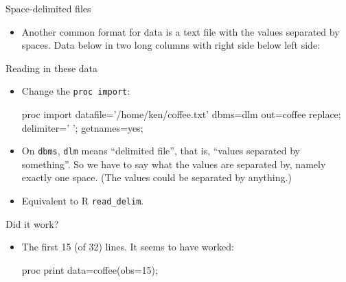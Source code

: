 \documentclass[unknownkeysallowed]{beamer}\usepackage[]{graphicx}\usepackage[]{color}
\begin{document}
\begin{frame}[fragile]{Space-delimited files}
  
  \begin{itemize}
  \item Another common format for data is a text file with the values
    separated by spaces. Data below in two long columns with right
    side below left side:
    
    \begin{footnotesize}
    \begin{multicols}{2}
      
    \end{multicols}
      
    \end{footnotesize}
    
  \end{itemize}
  
\end{frame}

\begin{frame}[fragile]{Reading in these data}
  
  \begin{itemize}
  \item Change the \texttt{proc import}:
    
    \begin{Datastep}
proc import 
  datafile='/home/ken/coffee.txt'
  dbms=dlm
  out=coffee
  replace;
  delimiter=' ';
  getnames=yes;
    \end{Datastep}
  \item On \texttt{dbms}, \texttt{dlm} means ``delimited file'', that
    is, ``values separated by something''. So we have to say what the
    values are separated by, namely exactly one space. (The values
    could be separated by anything.) 
  \item Equivalent to R \texttt{read\_delim}.
  \end{itemize}
  
\end{frame}

\begin{frame}[fragile]{Did it work?}
  
  \begin{itemize}
  \item The first 15 (of 32) lines. It seems to have worked:
    
    \begin{Sascode}[store=rc]
proc print data=coffee(obs=15);      
    \end{Sascode}
    
  \end{itemize}
  
\end{frame}
\end{document}
